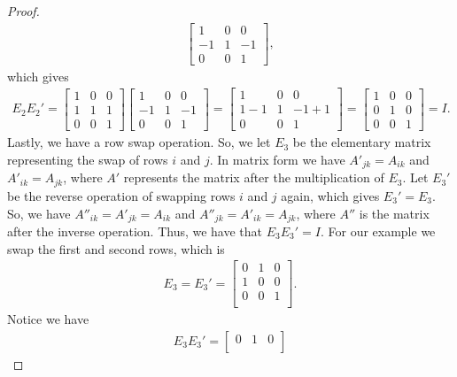 \documentclass{article}
\begin{document}
\begin{flushleft}
\begin{proof}
\begin{align*}
\begin{bmatrix}
					1 & 0 & 0 \\
					-1 & 1 & -1 \\
					0 & 0 & 1
				\end{bmatrix},
			\end{align*}
			which gives
			\begin{align*}
				E_2 E_2' = \begin{bmatrix}
					1 & 0 & 0 \\
					1 & 1 & 1 \\
					0 & 0 & 1
				\end{bmatrix}
				\begin{bmatrix}
					1 & 0 & 0 \\
					-1 & 1 & -1 \\
					0 & 0 & 1
				\end{bmatrix}
				= \begin{bmatrix}
					1 & 0 & 0 \\
					1 - 1 & 1 & -1 + 1 \\
					0 & 0 & 1
				\end{bmatrix}
				= \begin{bmatrix}
					1 & 0 & 0 \\
					0 & 1 & 0 \\
					0 & 0 & 1
				\end{bmatrix}
				= I.
			\end{align*}
			Lastly, we have a row swap operation. So, we let $E_3$ be the elementary matrix representing the swap of rows $i$ and $j$. In matrix form we have $A'_{jk} = A_{ik}$ and $A'_{ik} = A_{jk}$, where $A'$ represents the matrix after the multiplication of $E_3$. Let $E_3'$ be the reverse operation of swapping rows $i$ and $j$ again, which gives $E_3' = E_3$. So, we have $A''_{ik} = A'_{jk} = A_{ik}$ and $A''_{jk} = A'_{ik} = A_{jk}$, where $A''$ is the matrix after the inverse operation. Thus, we have that $E_3 E_3' = I$. For our example we swap the first and second rows, which is
			\begin{align*}
				E_3 = E_3' = \begin{bmatrix}
					0 & 1 & 0 \\
					1 & 0 & 0 \\
					0 & 0 & 1 \\
				\end{bmatrix}.
			\end{align*}
			Notice we have
			\begin{align*}
				E_3 E_3' = \begin{bmatrix}
					0 & 1 & 0 \\

\end{bmatrix}
\end{align*}
\end{proof}
\end{flushleft}
\end{document}
